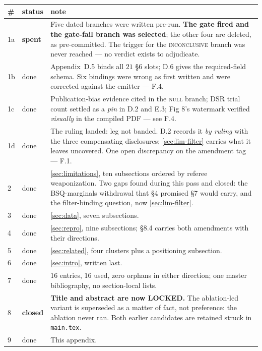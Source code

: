 \begin{center}
\begin{tabular}{llp{}}
\toprule
\# & status & note \\
\midrule
1a & \textbf{spent} & Five dated branches were written pre-run. \textbf{The gate fired and the
gate-fail branch was selected}; the other four are deleted, as pre-committed. The trigger for the
\textsc{inconclusive} branch was never reached --- no verdict exists to adjudicate. \\
1b & done & Appendix~D.5 binds all $21$ \S6 slots; D.6 gives the required-field schema.
Six bindings were wrong as first written and were corrected against the emitter --- F.4. \\
1c & done & Publication-bias evidence cited in the \textsc{null} branch; DSR trial count settled
as a \emph{pin} in D.2 and E.3; Fig 8's watermark verified \emph{visually} in the compiled
PDF --- see F.4. \\
1d & done & The ruling landed: leg not banded. D.2 records it \emph{by ruling} with the three
compensating disclosures; \cref{sec:lim-filter} carries what it leaves uncovered. One open
discrepancy on the amendment tag --- F.1. \\
2 & done & \cref{sec:limitations}, ten subsections ordered by referee weaponization. Two gaps
found during this pass and closed: the BSQ-marginals withdrawal that \S4 promised \S7 would carry,
and the filter-binding question, now \cref{sec:lim-filter}. \\
3 & done & \cref{sec:data}, seven subsections. \\
4 & done & \cref{sec:repro}, nine subsections; \S8.4 carries both amendments with their
directions. \\
5 & done & \cref{sec:related}, four clusters plus a positioning subsection. \\
6 & done & \cref{sec:intro}, written last. \\
7 & done & $16$ entries, $16$ used, zero orphans in either direction; one master bibliography, no
section-local lists. \\
8 & \textbf{closed} & \textbf{Title and abstract are now LOCKED.} The ablation-led variant is
superseded as a matter of fact, not preference: the ablation never ran. Both earlier candidates are
retained struck in \texttt{main.tex}. \\
9 & done & This appendix. \\
\bottomrule
\end{tabular}
\end{center}

